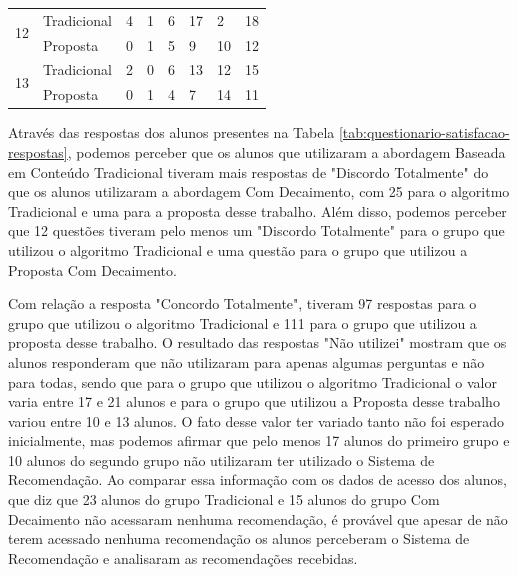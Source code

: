 \begin{table}[h]
\begin{tabular}{|p{1.5cm}|p{1.8cm}|p{2.2cm}|p{0.6cm}|p{0.6cm}|p{0.6cm}|p{2.3cm}|p{2cm}|}
\hline
\multirow{2}{*}{12}         & Tradicional & 4                   & 1                     & 6                         & 17                    & 2                   & 18           \\
                            & Proposta    & 0                   & 1                     & 5                         & 9                     & 10                  & 12           \\
\hline
\multirow{2}{*}{13}         & Tradicional & 2                   & 0                     & 6                         & 13                    & 12                  & 15           \\
                            & Proposta    & 0                   & 1                     & 4                         & 7                     & 14                  & 11           \\
\hline
\end{tabular}
\end{table}

Através das respostas dos alunos presentes na Tabela \ref{tab:questionario-satisfacao-respostas}, podemos perceber que
os alunos que utilizaram a abordagem Baseada em Conteúdo Tradicional tiveram mais respostas de "Discordo Totalmente" do
que os alunos utilizaram a abordagem Com Decaimento, com 25 para o algoritmo Tradicional e uma para a proposta desse trabalho.
Além disso, podemos perceber que 12 questões tiveram pelo menos um "Discordo Totalmente" para o grupo que utilizou o algoritmo
Tradicional e uma questão para o grupo que utilizou a Proposta Com Decaimento.

Com relação a resposta "Concordo Totalmente", tiveram 97 respostas para o grupo que utilizou o algoritmo Tradicional e 111
para o grupo que utilizou a proposta desse trabalho. O resultado das respostas "Não utilizei" mostram que os alunos responderam
que não utilizaram para apenas algumas perguntas e não para todas, sendo que para o grupo
que utilizou o algoritmo Tradicional o valor varia entre 17 e 21 alunos e para o grupo que utilizou a Proposta desse
trabalho variou entre 10 e 13 alunos. O fato desse valor ter variado tanto não foi esperado inicialmente, mas podemos afirmar que pelo menos 17 alunos do primeiro grupo e 10 alunos do segundo grupo
não utilizaram ter utilizado o Sistema de Recomendação. Ao comparar essa informação com os dados de acesso
dos alunos, que diz que 23 alunos do grupo Tradicional e 15 alunos do grupo Com Decaimento não acessaram nenhuma recomendação,
é provável que apesar de não terem acessado nenhuma recomendação os alunos perceberam o Sistema de Recomendação e analisaram
as recomendações recebidas.

